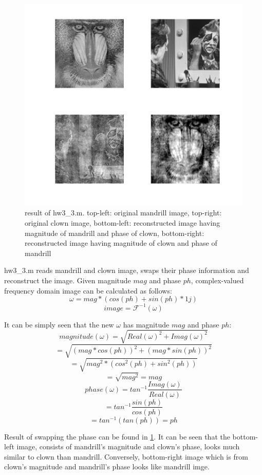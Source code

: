 \documentclass[extendedabs]{bmvc2k}
\begin{document}
\begin{figure}[h]
    \centering
    \includegraphics[width=\linewidth]{hw3_3_1}
    \caption{result of hw3\_3.m. top-left: original mandrill image, top-right: original clown image,
    bottom-left: reconstructed image having magnitude of mandrill and phase of clown,
    bottom-right: reconstructed image having magnitude of clown and phase of mandrill}
    \label{fig:3}
\end{figure}

hw3\_3.m reads mandrill and clown image, swaps their phase information and reconstruct the image.
Given magnitude $mag$ and phase $ph$, complex-valued frequency domain image can be calculated as follows:
\[\omega = mag * (cos(ph) + sin(ph) * 1j)\]
\[image = \mathcal{F}^{-1}(\omega)\]

It can be simply seen that the new $\omega$ has magnitude $mag$ and phase $ph$:
\[magnitude(\omega) = \sqrt{Real(\omega)^2 + Imag(\omega)^2}\]
\[= \sqrt{(mag * cos(ph))^2 + (mag * sin(ph))^2}\]
\[= \sqrt{mag^2 * (cos^2(ph) + sin^2(ph))}\]
\[= \sqrt{mag^2} = mag\] 
\[phase(\omega) = tan^{-1}\frac{Imag(\omega)}{Real(\omega)}\]
\[= tan^{-1}\frac{sin(ph)}{cos(ph)}\]
\[= tan^{-1}(tan(ph)) = ph\]

Result of swapping the phase can be found in \figurename{\ref{fig:3}}.
It can be seen that the bottom-left image, consists of mandrill's magnitude and clown's phase,
looks much similar to clown than mandrill. Conversely, bottom-right image which is from clown's
magnitude and mandrill's phase looks like mandrill imge.
\end{document}

